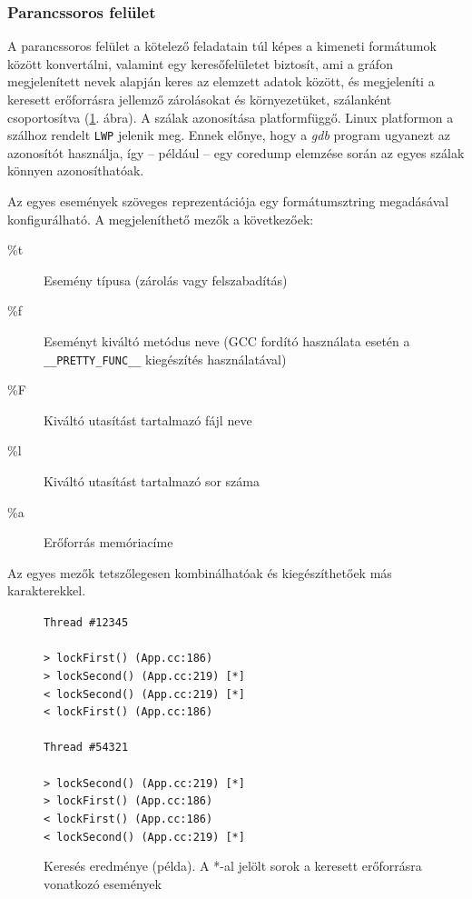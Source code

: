     \subsubsection{Parancssoros felület}
    
    A parancssoros felület a kötelező feladatain túl képes a kimeneti formátumok között konvertálni, valamint egy keresőfelületet biztosít, ami a gráfon megjelenített nevek alapján keres az elemzett adatok között, és megjeleníti a keresett erőforrásra jellemző zárolásokat és környezetüket, szálanként csoportosítva (\ref{fig:trace}. ábra). A szálak azonosítása platformfüggő. Linux platformon a szálhoz rendelt \texttt{LWP} jelenik meg. Ennek előnye, hogy a \emph{gdb} program ugyanezt az azonosítót használja, így -- például -- egy coredump elemzése során az egyes szálak könnyen azonosíthatóak.
    
    Az egyes események szöveges reprezentációja egy formátumsztring megadásával konfigurálható. A megjeleníthető mezők a következőek:

\begin{description}
    \item[\%t] Esemény típusa (zárolás vagy felszabadítás)
    \item[\%f] Eseményt kiváltó metódus neve (GCC fordító használata esetén a \\ \texttt{\_\_PRETTY\_FUNC\_\_} kiegészítés használatával)
    \item[\%F] Kiváltó utasítást tartalmazó fájl neve
    \item[\%l] Kiváltó utasítást tartalmazó sor száma
    \item[\%a] Erőforrás memóriacíme
\end{description}

\noindent     
Az egyes mezők tetszőlegesen kombinálhatóak és kiegészíthetőek más karakterekkel.
    
\begin{figure}[ht!]
    \noindent
    \texttt{Thread \#12345 \\
    \\
    > lockFirst() (App.cc:186) \\
    \hspace*{8pt}    > lockSecond() (App.cc:219) [*]\\
    \hspace*{8pt}    < lockSecond() (App.cc:219) [*]\\    
    < lockFirst() (App.cc:186) \\
    \\
    Thread \#54321 \\
    \\
    > lockSecond() (App.cc:219) [*]\\
    \hspace*{8pt}    > lockFirst() (App.cc:186) \\
    \hspace*{8pt}    < lockFirst() (App.cc:186) \\
    < lockSecond() (App.cc:219) [*]\\
    }
  \caption{Keresés eredménye (példa). A *-al jelölt sorok a keresett erőforrásra vonatkozó események}
  \label{fig:trace}
\end{figure}

